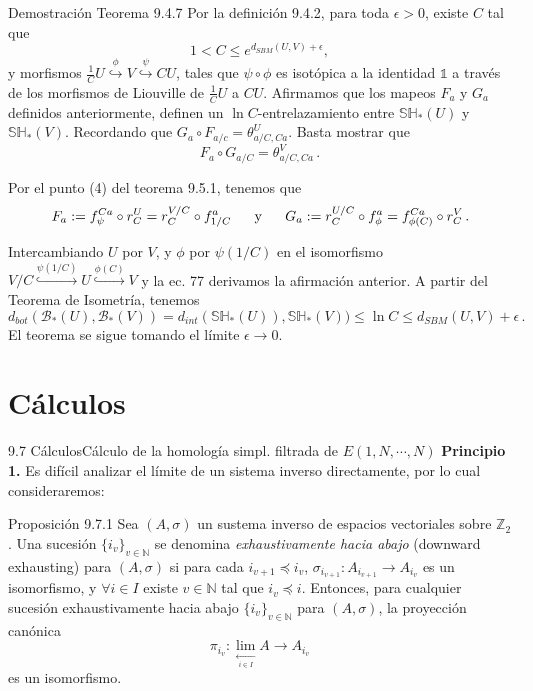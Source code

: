 \documentclass{beamer}
\begin{document}
\begin{frame}{Demostraci\'on Teorema 9.4.7}
Por la definici\'on 9.4.2, para toda $\epsilon >0$, existe $C$ tal que $$1<C\leq e^{d_{SBM}(U,V)+\epsilon},$$
y morfismos $\frac{1}{C}U \overset{\phi}{\hookrightarrow} V \overset{\psi}{\hookrightarrow} CU$, tales que $\psi\circ\phi$ es isot\'opica a la identidad $\mathbb{1}$ a trav\'es de los morfismos de Liouville de $\frac{1}{C}U$ a $CU$. Afirmamos que los mapeos $F_a$ y $G_a$ definidos anteriormente, definen un $\ln C$-entrelazamiento entre $\mathbb{SH}_{\ast}(U)$ y $\mathbb{SH}_{\ast}(V)$. Recordando que $G_a\circ F_{a/c}=\theta_{a/C,Ca}^{U}$. Basta mostrar que $$F_{a}\circ G_{a/C}=\theta_{a/C,Ca}^V\,.$$
\end{frame}

\begin{frame}
Por el punto (4) del teorema 9.5.1, tenemos que
$$F_a:=f_{\psi}^{Ca}\circ r_{C}^{U}=r_{C}^{V/C}\circ f_{1/C}^{a}\,\hspace{1.5em}\mbox{y}\,\hspace{1.5em}G_{a}:=r_{C}^{U/C}\circ f_{\phi}^{a}=f_{\phi(C)}^{Ca}\circ r_{C}^{V}\,.$$

Intercambiando $U$ por $V$, y $\phi$ por $\psi(1/C)$ en el isomorfismo $V/C \overset{\psi(1/C)}{\hookrightarrow}U \overset{\phi(C)}{\hookrightarrow}V$ y la ec. 77 derivamos la afirmaci\'on anterior.
\vspace{1em}
A partir del Teorema de Isometr\'ia, tenemos
$$d_{bot}(\mathcal{B}_{\ast}(U),\mathcal{B}_{\ast}(V))=d_{int}(\mathbb{SH}_{\ast}(U)),\mathbb{SH}_{\ast}(V))\leq \ln C\leq d_{SBM}(U,V)+\epsilon\,.$$
El teorema se sigue tomando el l\'imite $\epsilon \rightarrow 0$.
\end{frame}


\section{C\'alculos}

\begin{frame}{9.7 C\'alculos}{C\'alculo de la homolog\'ia simpl. filtrada de $ E(1,N,\cdots,N)$}
{\bfseries Principio 1.} Es dif\'icil analizar el l\'imite de un sistema inverso directamente, por lo cual consideraremos:\\
\vspace{1em}
\begin{block}{Proposici\'on 9.7.1} Sea $(A,\sigma)$ un sustema inverso de espacios vectoriales sobre $\mathbb{Z}_2$. Una sucesi\'on $\{i_{v}\}_{v\in \mathbb{N}}$ se denomina \emph{exhaustivamente hacia abajo} (downward exhausting) para $(A,\sigma)$ si para cada $i_{v+1}\preceq i_{v}$, $\sigma_{i_{v+1}}:A_{i_{v+1}}\rightarrow A_{i_{v}}$ es un isomorfismo, y $\forall i\in I$ existe $v\in \mathbb{N}$ tal que $i_{v}\preceq i$. Entonces, para cualquier sucesi\'on exhaustivamente hacia abajo $\{i_{v}\}_{v\in \mathbb{N}}$ para $(A,\sigma)$, la proyecci\'on can\'onica $$\pi_{i_{v}}: \lim_{  \xleftarrow[i\in I]{}} A\rightarrow A_{i_{v}}$$ es un isomorfismo.
\end{block}
\end{frame}
\end{document}
